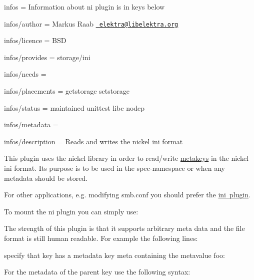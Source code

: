 
\begin{DoxyItemize}
\item infos = Information about ni plugin is in keys below
\item infos/author = Markus Raab \href{mailto:elektra@libelektra.org}{\texttt{ elektra@libelektra.\+org}}
\item infos/licence = B\+SD
\item infos/provides = storage/ini
\item infos/needs =
\item infos/placements = getstorage setstorage
\item infos/status = maintained unittest libc nodep
\item infos/metadata =
\item infos/description = Reads and writes the nickel ini format
\end{DoxyItemize}

This plugin uses the nickel library in order to read/write \mbox{\hyperlink{doc_help_elektra-metadata_md}{metakeys}} in the nickel ini format. It\textquotesingle{}s purpose is to be used in the {\ttfamily spec}-\/namespace or when any metadata should be stored.

For other applications, e.\+g. modifying {\ttfamily smb.\+conf} you should prefer the \mbox{\hyperlink{autotoc_md292_src_plugins_ini_README_md}{ini plugin}}.

To mount the ni plugin you can simply use\+:


\begin{DoxyCode}{0}
\end{DoxyCode}


The strength of this plugin is that it supports arbitrary meta data and the file format is still human readable. For example the following lines\+:


\begin{DoxyCode}{0}
\DoxyCodeLine{[key]}
\end{DoxyCode}


specify that {\ttfamily key} has a metadata key {\ttfamily meta} containing the metavalue {\ttfamily foo}\+:


\begin{DoxyCode}{0}
\end{DoxyCode}


For the metadata of the parent key use the following syntax\+:


